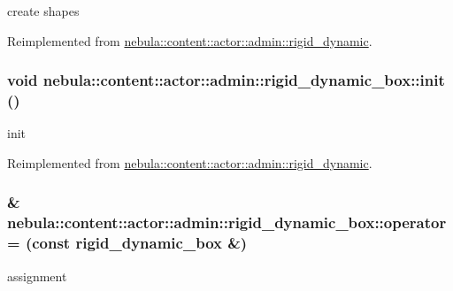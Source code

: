create shapes 

Reimplemented from \hyperlink{classnebula_1_1content_1_1actor_1_1admin_1_1rigid__dynamic_a263f07931e9281ea4044c522b567dde1}{nebula::content::actor::admin::rigid\_\-dynamic}.\hypertarget{classnebula_1_1content_1_1actor_1_1admin_1_1rigid__dynamic__box_a3d03f28e3ba455be0f39ad66e00c02c9}{
\subsubsection[{init}]{\setlength{\rightskip}{0pt plus 5cm}void nebula::content::actor::admin::rigid\_\-dynamic\_\-box::init ()}}
\label{classnebula_1_1content_1_1actor_1_1admin_1_1rigid__dynamic__box_a3d03f28e3ba455be0f39ad66e00c02c9}


init 

Reimplemented from \hyperlink{classnebula_1_1content_1_1actor_1_1admin_1_1rigid__dynamic_af30bd690cfa2d1a98b1458c658dc97d6}{nebula::content::actor::admin::rigid\_\-dynamic}.\hypertarget{classnebula_1_1content_1_1actor_1_1admin_1_1rigid__dynamic__box_aeed451b7d00e75948f474e4bb20404ba}{
\subsubsection[{operator=}]{\& nebula::content::actor::admin::rigid\_\-dynamic\_\-box::operator= (const {\bf rigid\_\-dynamic\_\-box} \&)}}
\label{classnebula_1_1content_1_1actor_1_1admin_1_1rigid__dynamic__box_aeed451b7d00e75948f474e4bb20404ba}


assignment 


